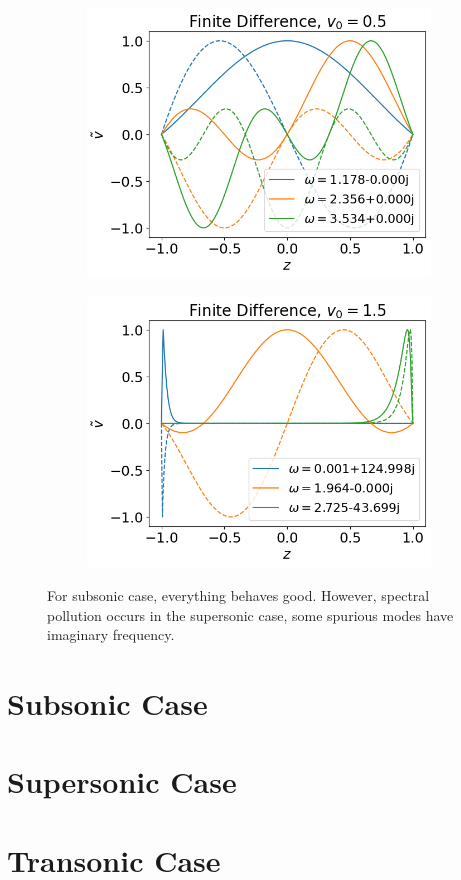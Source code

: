 \begin{figure}[H]
	\centering
	\begin{subfigure}[b]{0.5\textwidth}
		\includegraphics[width=\linewidth]{img/constant_v/eigenfuncs-fd-v0=0.5}
	\end{subfigure}%
	\begin{subfigure}[b]{0.5\textwidth}
		\includegraphics[width=\linewidth]{img/constant_v/eigenfuncs-fd-v0=1.5}
	\end{subfigure}
	\caption{For subsonic case, everything behaves good. However, spectral pollution occurs in the supersonic case, some spurious modes have imaginary frequency.}
	\label{fig:eigenfuncs-constant-v}
\end{figure}


\section{Subsonic Case}

\section{Supersonic Case}

\section{Transonic Case}